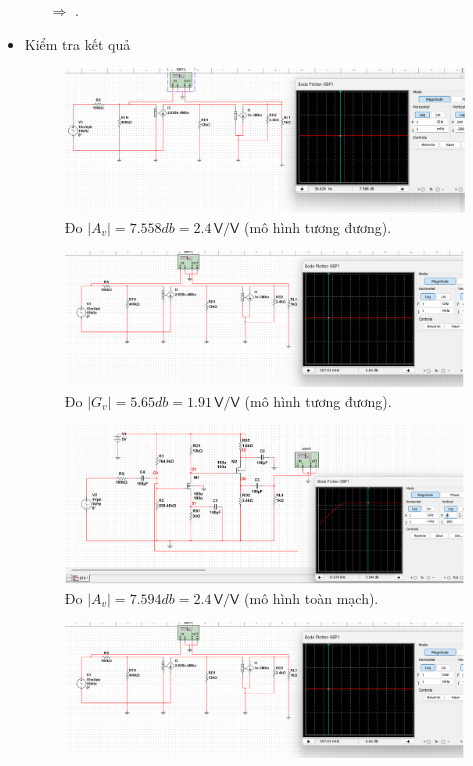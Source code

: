 \begin{itemize}[label=-]
\begin{itemize}[label=+, leftmargin=2cm]
		$\Rightarrow$ .
	\end{itemize}
	
	\item Kiểm tra kết quả
	
	\begin{figure}[H]
		\centering
		\includegraphics[width=.9\linewidth]{./my-chapters/my-images/Question8/b_av_tuongduong.png}
		\caption{Đo $|A_{v}| =7.558 db = 2.4 \,\textsf{V/V}$ (mô hình tương đương).}
	\end{figure}
	\begin{figure}[H]
		\centering
		\includegraphics[width=.9\linewidth]{./my-chapters/my-images/Question8/b_gv_tuongduong.png}
		\caption{Đo $|G_{v}| = 5.65db = 1.91 \,\textsf{V/V}$ (mô hình tương đương).}
	\end{figure}
	\begin{figure}[H]
		\centering
		\includegraphics[width=.9\linewidth]{./my-chapters/my-images/Question8/b_av_toanmach.png}
		\caption{Đo $|A_{v}| = 7.594db = 2.4 \,\textsf{V/V}$ (mô hình toàn mạch).}
	\end{figure}
	\begin{figure}[H]
		\centering
		\includegraphics[width=.9\linewidth]{./my-chapters/my-images/Question8/b_gv_tuongduong.png}

\end{figure}
\end{itemize}
